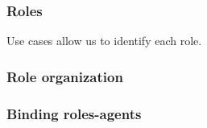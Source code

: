 \documentclass[a4paper,11pt]{report}
\begin{document}
  
  \subsubsection{Roles}
  
  Use cases allow us to identify each role.
  
  
  \subsubsection{Role organization}
  
  
  \subsubsection{Binding roles-agents}

  
  
\end{document}
